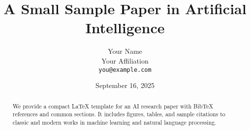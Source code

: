 \documentclass[11pt]{article}
\title{A Small Sample Paper in Artificial Intelligence}
\author{Your Name \\ Your Affiliation \\ \texttt{you@example.com}}
\date{September 16, 2025}
\begin{document}
\maketitle

\begin{abstract}
We provide a compact LaTeX template for an AI research paper with Bib\TeX{} references and common sections. It includes figures, tables, and sample citations to classic and modern works in machine learning and natural language processing.
\end{abstract}











\end{document}

